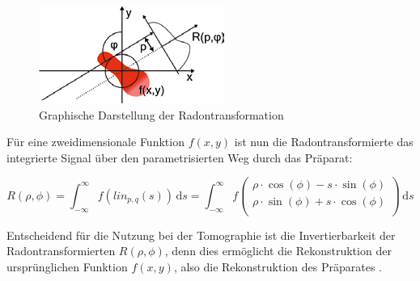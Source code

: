 \begin{figure}[H]
	\centering
\includegraphics[width=0.6\linewidth]{IMAGE/radon.png}
	\caption{Graphische Darstellung der Radontransformation \cite{slot_paper}}
	\label{fig:radon}
\end{figure}

Für eine zweidimensionale Funktion $f(x,y)$ ist nun die Radontransformierte das integrierte Signal über den parametrisierten Weg durch das Präparat:

\begin{equation}
R(\rho,\phi) = \int_{- \infty}^{\infty} f(lin_{p,q}(s)) \,\mathrm{d}s
=
\int_{- \infty}^{\infty} f\begin{pmatrix}
\rho \cdot \cos(\phi) - s \cdot \sin(\phi) \\
\rho \cdot \sin(\phi) + s \cdot \cos(\phi) \\
\end{pmatrix} \,\mathrm{d}s
\end{equation}

Entscheidend für die Nutzung bei der Tomographie ist die Invertierbarkeit der Radontransformierten $R(\rho,\phi)$, denn dies ermöglicht die Rekonstruktion der ursprünglichen Funktion $f(x,y)$, also die Rekonstruktion des Präparates \cite{slot_paper}.

